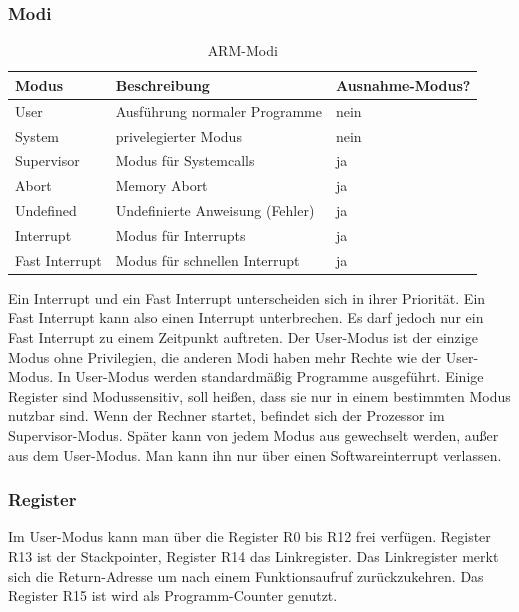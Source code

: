 \subsubsection{Modi}
\begin{table}
    \begin{tabular}{lll}
    Modus          & Beschreibung                    & Ausnahme-Modus? \\ \hline
    User           & Ausführung normaler Programme   & nein            \\
    System         & privelegierter Modus            & nein            \\
    Supervisor     & Modus für Systemcalls           & ja              \\
    Abort          & Memory Abort                    & ja              \\
    Undefined      & Undefinierte Anweisung (Fehler) & ja              \\
    Interrupt      & Modus für Interrupts            & ja              \\
    Fast Interrupt & Modus für schnellen Interrupt   & ja              \\
    \end{tabular}
    \caption {ARM-Modi}
\end{table}
Ein Interrupt und ein Fast Interrupt unterscheiden sich in ihrer Priorität. Ein Fast Interrupt kann also einen Interrupt unterbrechen. Es darf jedoch nur ein Fast Interrupt zu einem Zeitpunkt auftreten. Der User-Modus ist der einzige Modus ohne Privilegien, die anderen Modi haben mehr Rechte wie der User-Modus. In User-Modus werden standardmäßig Programme ausgeführt. Einige Register sind Modussensitiv, soll heißen, dass sie nur in einem bestimmten Modus nutzbar sind. Wenn der Rechner startet, befindet sich der Prozessor im Supervisor-Modus. Später kann von jedem Modus aus gewechselt werden, außer aus dem User-Modus. Man kann ihn nur über einen Softwareinterrupt verlassen. 
\subsubsection{Register}
Im User-Modus kann man über die Register R0 bis R12 frei verfügen. Register R13 ist der Stackpointer, Register R14 das Linkregister. Das Linkregister merkt sich die Return-Adresse um nach einem Funktionsaufruf zurückzukehren. Das Register R15 ist wird als Programm-Counter genutzt.

